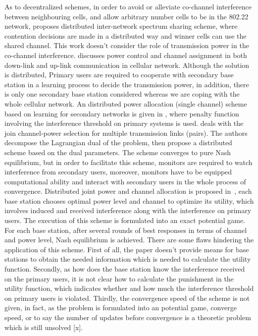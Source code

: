 As to decentralized schemes, in order to avoid or alleviate co-channel interference between neighbouring cells, and allow arbitrary number cells to be in the 802.22 network, \cite{Inter-Network_Spectrum_Sharing_80222_08} proposes distributed inter-network spectrum sharing scheme, where contention decisions are made in a distributed way and winner cells can use the shared channel.
This work doesn't consider the role of transmission power in the co-channel interference.
\cite{HoangPowerChannel2010} discusses power control and channel assignment in both down-link and up-link communication in cellular network. 
Although the solution is distributed, Primary users are required to cooperate with secondary base station in a learning process to decide the transmission power, in addition, there is only one secondary base station considered whereas we are coping with the whole cellular network. 
An distributed power allocation (single channel) scheme based on learning for secondary networks is given in \cite{aggregatedInf_Galindo_crowncom09}, where penalty function involving the interference threshold on primary systems is used.
\cite{wuinfocom09} deals with the join channel-power selection for multiple transmission links (pairs). 
The authors decompose the Lagrangian dual of the problem, then propose a distributed scheme based on the dual parameters. 
The scheme converges to pure Nash equilibrium, but in order to facilitate this scheme, monitors are required to watch interference from secondary users, moreover, monitors have to be equipped computational ability and interact with secondary users in the whole process of convergence.
Distributed joint power and channel allocation is proposed in~\cite{pimrc_2012}, each base station chooses optimal power level and channel to optimize its utility, which involves induced and received interference along with the interference on primary users. 
The execution of this scheme is formulated into an exact potential game. 
For each base station, after several rounds of best responses in terms of channel and power level, Nash equilibrium is achieved.
There are some flaws hindering the application of this scheme.
First of all, the paper doesn't provide means for base stations to obtain the needed information which is needed to calculate the utility function.
Secondly, as how does the base station know the interference received on the primary users, it is not clear how to calculate the punishment in the utility function, which indicates whether and how much the interference threshold on primary users is violated.
Thirdly, the convergence speed of the scheme is not given, in fact, as the problem is formulated into an potential game, converge speed, or to say the number of updates before convergence is a theoretic problem which is still unsolved [x].
